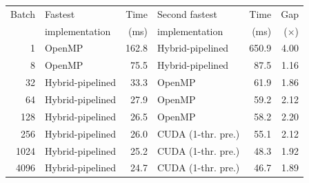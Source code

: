\begin{tabular}{rlrlrr}
\toprule
Batch & Fastest & Time & Second fastest & Time & Gap \\
 & implementation & (ms) & implementation & (ms) & ($\times$) \\
\midrule
1 & OpenMP & 162.8 & Hybrid-pipelined & 650.9 & 4.00 \\
8 & OpenMP & 75.5 & Hybrid-pipelined & 87.5 & 1.16 \\
32 & Hybrid-pipelined & 33.3 & OpenMP & 61.9 & 1.86 \\
64 & Hybrid-pipelined & 27.9 & OpenMP & 59.2 & 2.12 \\
128 & Hybrid-pipelined & 26.5 & OpenMP & 58.2 & 2.20 \\
256 & Hybrid-pipelined & 26.0 & CUDA (1-thr. pre.) & 55.1 & 2.12 \\
1024 & Hybrid-pipelined & 25.2 & CUDA (1-thr. pre.) & 48.3 & 1.92 \\
4096 & Hybrid-pipelined & 24.7 & CUDA (1-thr. pre.) & 46.7 & 1.89 \\
\bottomrule
\end{tabular}

